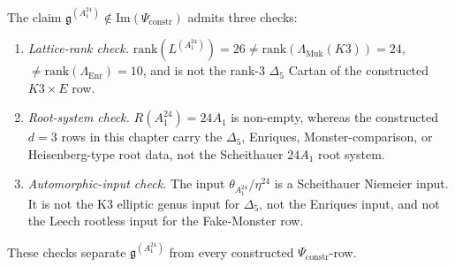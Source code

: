\begin{remark}
\label{rem:psi-counterexample-verification}
The claim $\mathfrak{g}^{(A_1^{24})} \notin \mathrm{Im}(\Psi_{\mathrm{constr}})$ admits three checks:
\begin{enumerate}[label=\textup{(\arabic*)}]
 \item \emph{Lattice-rank check.} $\mathrm{rank}(L^{(A_1^{24})}) = 26 \neq \mathrm{rank}(\Lambda_{\mathrm{Muk}}(K3)) = 24$, $\neq \mathrm{rank}(\Lambda_{\mathrm{Enr}}) = 10$, and is not the rank-$3$ $\Delta_5$ Cartan of the constructed $K3\times E$ row.
 \item \emph{Root-system check.} $R(A_1^{24}) = 24 A_1$ is non-empty, whereas the constructed $d=3$ rows in this chapter carry the $\Delta_5$, Enriques, Monster-comparison, or Heisenberg-type root data, not the Scheithauer $24A_1$ root system.
 \item \emph{Automorphic-input check.} The input $\theta_{A_1^{24}}/\eta^{24}$ is a Scheithauer Niemeier input. It is not the K3 elliptic genus input for $\Delta_5$, not the Enriques input, and not the Leech rootless input for the Fake-Monster row.
\end{enumerate}
These checks separate $\mathfrak{g}^{(A_1^{24})}$ from every constructed \(\Psi_{\mathrm{constr}}\)-row.
\end{remark}

